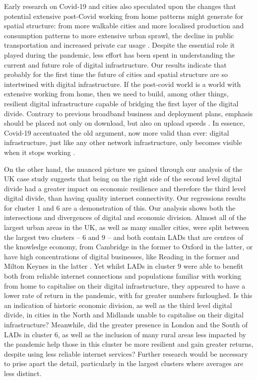 \documentclass[]{interact}
\theoremstyle{plain}%
\theoremstyle{definition}
\theoremstyle{remark}
\begin{document}
Early research on Covid-19 and cities also speculated upon the changes
that potential extensive post-Covid working from home patterns might
generate for spatial structure: from more walkable cities and more
localised production and consumption patterns to more extensive urban
sprawl, the decline in public transportation and increased private car
usage \citep{batty2020editorial}. Despite the essential role it played
during the pandemic, less effort has been spent in understanding the
current and future role of digital infrastructure. Our results indicate
that probably for the first time the future of cities and spatial
structure are so intertwined with digital infrastructure. If the
post-covid world is a world with extensive working from home, then we
need to build, among other things, resilient digital infrastructure
capable of bridging the first layer of the digital divide. Contrary to
previous broadband business and deployment plans, emphasis should be
placed not only on download, but also on upload speeds
\citep{brake2020lessons}. In essence, Covid-19 accentuated the old
argument, now more valid than ever: digital infrastructure, just like
any other network infrastructure, only becomes visible when it stops
working \citep{star1999, tranos2013geography}.

On the other hand, the nuanced picture we gained through our analysis of
the UK case study suggests that being on the right side of the second
level digital divide had a greater impact on economic resilience and
therefore the third level digital divide, than having quality internet
connectivity. Our regressions results for cluster \(1\) and \(6\) are a
demonstration of this. Our analysis shows both the intersections and
divergences of digital and economic division. Almost all of the largest
urban areas in the UK, as well as many smaller cities, were split
between the largest two clusters -- \(6\) and \(9\) -- and both contain
LADs that are centres of the knowledge economy, from Cambridge in the
former to Oxford in the latter, or have high concentrations of digital
businesses, like Reading in the former and Milton Keynes in the latter
\citep{technation2017}. Yet whilst LADs in cluster \(9\) were able to
benefit both from reliable internet connections and populations familiar
with working from home to capitalise on their digital infrastructure,
they appeared to have a lower rate of return in the pandemic, with far
greater numbers furloughed. Is this an indication of historic economic
division, as well as the third level digital divide, in cities in the
North and Midlands unable to capitalise on their digital infrastructure?
Meanwhile, did the greater presence in London and the South of LADs in
cluster \(6\), as well as the inclusion of many rural areas less
impacted by the pandemic help those in this cluster be more resilient
and gain greater returns, despite using less reliable internet services?
Further research would be necessary to prise apart the detail,
particularly in the largest clusters where averages are less distinct.
\end{document}
